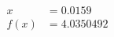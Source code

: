\documentclass[preview]{standalone}
\begin{document}
\begin{align*}
x &= 0.0159\\f(x) &= 4.0350492
\end{align*}
\end{document}
